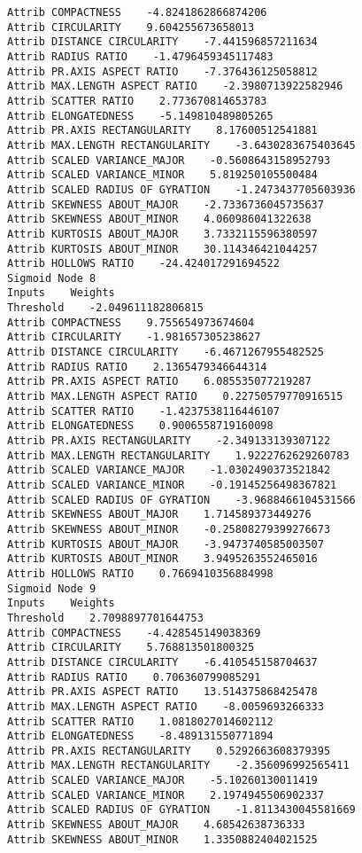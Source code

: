 \documentclass[
	article,			%
	11pt,				%
	oneside,			%
	a4paper,			%
	english,			%
	brazil,				%
	sumario=tradicional
	]{abntex2}
\begin{document}
\begin{lstlisting}
Attrib COMPACTNESS    -4.8241862866874206
Attrib CIRCULARITY    9.604255673658013
Attrib DISTANCE CIRCULARITY    -7.441596857211634
Attrib RADIUS RATIO    -1.4796459345117483
Attrib PR.AXIS ASPECT RATIO    -7.376436125058812
Attrib MAX.LENGTH ASPECT RATIO    -2.3980713922582946
Attrib SCATTER RATIO    2.773670814653783
Attrib ELONGATEDNESS    -5.149810489805265
Attrib PR.AXIS RECTANGULARITY    8.17600512541881
Attrib MAX.LENGTH RECTANGULARITY    -3.6430283675403645
Attrib SCALED VARIANCE_MAJOR    -0.5608643158952793
Attrib SCALED VARIANCE_MINOR    5.819250105500484
Attrib SCALED RADIUS OF GYRATION    -1.2473437705603936
Attrib SKEWNESS ABOUT_MAJOR    -2.7336736045735637
Attrib SKEWNESS ABOUT_MINOR    4.060986041322638
Attrib KURTOSIS ABOUT_MAJOR    3.7332115596380597
Attrib KURTOSIS ABOUT_MINOR    30.114346421044257
Attrib HOLLOWS RATIO    -24.424017291694522
Sigmoid Node 8
Inputs    Weights
Threshold    -2.049611182806815
Attrib COMPACTNESS    9.755654973674604
Attrib CIRCULARITY    -1.981657305238627
Attrib DISTANCE CIRCULARITY    -6.4671267955482525
Attrib RADIUS RATIO    2.1365479346644314
Attrib PR.AXIS ASPECT RATIO    6.085535077219287
Attrib MAX.LENGTH ASPECT RATIO    0.22750579770916515
Attrib SCATTER RATIO    -1.4237538116446107
Attrib ELONGATEDNESS    0.9006558719160098
Attrib PR.AXIS RECTANGULARITY    -2.349133139307122
Attrib MAX.LENGTH RECTANGULARITY    1.9222762629260783
Attrib SCALED VARIANCE_MAJOR    -1.0302490373521842
Attrib SCALED VARIANCE_MINOR    -0.19145256498367821
Attrib SCALED RADIUS OF GYRATION    -3.9688466104531566
Attrib SKEWNESS ABOUT_MAJOR    1.714589373449276
Attrib SKEWNESS ABOUT_MINOR    -0.25808279399276673
Attrib KURTOSIS ABOUT_MAJOR    -3.9473740585003507
Attrib KURTOSIS ABOUT_MINOR    3.9495263552465016
Attrib HOLLOWS RATIO    0.7669410356884998
Sigmoid Node 9
Inputs    Weights
Threshold    2.7098897701644753
Attrib COMPACTNESS    -4.428545149038369
Attrib CIRCULARITY    5.768813501800325
Attrib DISTANCE CIRCULARITY    -6.410545158704637
Attrib RADIUS RATIO    0.706360799085291
Attrib PR.AXIS ASPECT RATIO    13.514375868425478
Attrib MAX.LENGTH ASPECT RATIO    -8.0059693266333
Attrib SCATTER RATIO    1.0818027014602112
Attrib ELONGATEDNESS    -8.489131550771894
Attrib PR.AXIS RECTANGULARITY    0.5292663608379395
Attrib MAX.LENGTH RECTANGULARITY    -2.356096992565411
Attrib SCALED VARIANCE_MAJOR    -5.10260130011419
Attrib SCALED VARIANCE_MINOR    2.1974945506902337
Attrib SCALED RADIUS OF GYRATION    -1.8113430045581669
Attrib SKEWNESS ABOUT_MAJOR    4.68542638736333
Attrib SKEWNESS ABOUT_MINOR    1.3350882404021525

\end{lstlisting}
\end{document}
